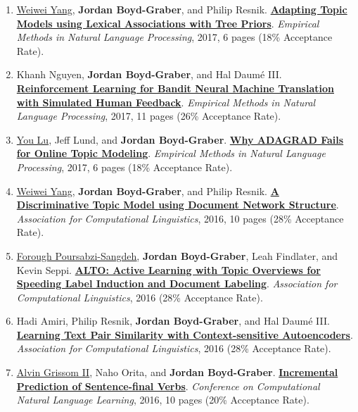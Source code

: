 {\begin{enumerate}
	 \item \underline{\href{https://ywwbill.github.io/}{Weiwei Yang}}, {\bf Jordan Boyd-Graber}, and Philip Resnik.  {\bf \href{http://cs.umd.edu/~jbg//docs/2017_emnlp_tree_prior.pdf}{Adapting Topic Models using Lexical Associations with Tree Priors}}.  \emph{Empirical Methods in Natural Language Processing}, 2017, 6 pages (18\% Acceptance Rate).

	 \item Khanh Nguyen, {\bf Jordan Boyd-Graber}, and Hal {Daum\'{e} III}.  {\bf \href{http://cs.umd.edu/~jbg//docs/2017_emnlp_bandit_mt.pdf}{Reinforcement Learning for Bandit Neural Machine Translation with Simulated Human Feedback}}.  \emph{Empirical Methods in Natural Language Processing}, 2017, 11 pages (26\% Acceptance Rate).

	 \item \underline{You Lu}, Jeff Lund, and {\bf Jordan Boyd-Graber}.  {\bf \href{http://cs.umd.edu/~jbg//docs/2017_emnlp_adagrad_olda.pdf}{Why ADAGRAD Fails for Online Topic Modeling}}.  \emph{Empirical Methods in Natural Language Processing}, 2017, 6 pages (18\% Acceptance Rate).

	 \item \underline{\href{https://ywwbill.github.io/}{Weiwei Yang}}, {\bf Jordan Boyd-Graber}, and Philip Resnik.  {\bf \href{http://cs.umd.edu/~jbg//docs/2016_acl_docblock.pdf}{A Discriminative Topic Model using Document Network Structure}}.  \emph{Association for Computational Linguistics}, 2016, 10 pages (28\% Acceptance Rate).

	 \item \underline{\href{https://www.microsoft.com/en-us/research/people/fpoursabzi/projects/}{Forough Poursabzi-Sangdeh}}, {\bf Jordan Boyd-Graber}, Leah Findlater, and Kevin Seppi.  {\bf \href{http://cs.umd.edu/~jbg//docs/2016_acl_doclabel.pdf}{ALTO: Active Learning with Topic Overviews for Speeding Label Induction and Document Labeling}}.  \emph{Association for Computational Linguistics}, 2016 (28\% Acceptance Rate).

	 \item Hadi Amiri, Philip Resnik, {\bf Jordan Boyd-Graber}, and Hal {Daum\'{e} III}.  {\bf \href{http://cs.umd.edu/~jbg//docs/2016_acl_context_ae.pdf}{Learning Text Pair Similarity with Context-sensitive Autoencoders}}.  \emph{Association for Computational Linguistics}, 2016 (28\% Acceptance Rate).

	 \item \underline{\href{https://agrissom.sites.haverford.edu/}{Alvin Grissom II}}, Naho Orita, and {\bf Jordan Boyd-Graber}.  {\bf \href{http://cs.umd.edu/~jbg//docs/2016_conll_verbpred.pdf}{Incremental Prediction of Sentence-final Verbs}}.  \emph{Conference on Computational Natural Language Learning}, 2016, 10 pages (20\% Acceptance Rate).


\end{enumerate}}
